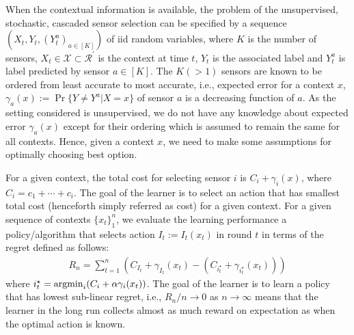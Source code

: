 When the contextual information is available, the problem of the unsupervised, stochastic, cascaded sensor selection can be specified by a sequence $(X_t,Y_t, (Y_t^a)_{a \in [K]})$ of iid random variables, where $K$ is the number of sensors, $X_t \in \mathcal{X} \subset \mathcal{R}^\prime$ is the context at time $t$, $Y_t$ is the associated label and $Y_t^a$ is label predicted by sensor $a \in [K]$. The $K(>1)$ sensors are known to be ordered from least accurate to most accurate, i.e., expected error for a context $x$, $\gamma_a(x) := \Pr\{Y \neq Y^a|X=x\}$ of sensor $a$ is a decreasing function of $a$. As the setting considered is unsupervised, we do not have any knowledge about expected error $\gamma_a(x)$ except for their ordering which is assumed to remain the same for all contexts. Hence, given a context $x$, we need to make some assumptions for optimally choosing best option. 

For a given context, the total cost for selecting sensor $i$ is $C_i + \gamma_i(x)$, where $C_i=c_1 + \cdots + c_{i}$. The goal of the learner is to select an action that has smallest total cost (henceforth simply referred as cost) for a given context. For a given sequence of contexts $\{x_t\}_1^n$, we evaluate the learning performance a policy/algorithm that selects action $I_t:=I_t(x_t)$ in round $t$ in terms of the regret defined as follows:  
\vspace{-.1cm}
\begin{align}
\label{equ:lin_regret}
R_n = \sum_{t=1}^n\left(C_{I_t} + \gamma_{I_t}(x_t) - (C_{i^\star_t} +\gamma_{i^\star_t}(x_t))\right)
\end{align}
where 	$i_t^\star= \operatorname{argmin}_i(C_i + \alpha\gamma_i(x_t))$. The goal of the learner is to learn a policy that has lowest sub-linear regret, i.e., $R_n/n \rightarrow 0$ as $n \rightarrow \infty$ 
means that the learner in the long run collects almost as much reward on expectation as when  the optimal action is known. 




